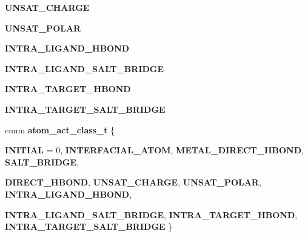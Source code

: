 \begin{CompactItemize}
\item 
\textbf{UNSAT\_\-CHARGE}\label{classASCbase_1_1ProtLigScore_38da0bbb70c6f5a88b37e99939fa72113a2e21f3f5eb470e89630ace57fca557}

\item 
\textbf{UNSAT\_\-POLAR}\label{classASCbase_1_1ProtLigScore_38da0bbb70c6f5a88b37e99939fa721193ca1d17e498b2126dd19ebeb0f93abf}

\item 
\textbf{INTRA\_\-LIGAND\_\-HBOND}\label{classASCbase_1_1ProtLigScore_38da0bbb70c6f5a88b37e99939fa721131df05afc5bf7240b89d5a0b09b0404b}

\item 
\textbf{INTRA\_\-LIGAND\_\-SALT\_\-BRIDGE}\label{classASCbase_1_1ProtLigScore_38da0bbb70c6f5a88b37e99939fa72119f36f771a2f0c2060396f693a09097aa}

\item 
\textbf{INTRA\_\-TARGET\_\-HBOND}\label{classASCbase_1_1ProtLigScore_38da0bbb70c6f5a88b37e99939fa7211465a604ea7061692e2e210b6b5d50a72}

\item 
\textbf{INTRA\_\-TARGET\_\-SALT\_\-BRIDGE}\label{classASCbase_1_1ProtLigScore_38da0bbb70c6f5a88b37e99939fa7211a154b072dd519a883d0b7b9b5c3b1055}

\item 
enum \textbf{atom\_\-act\_\-class\_\-t} \{ \par
\textbf{INITIAL} =  0, 
\textbf{INTERFACIAL\_\-ATOM}, 
\textbf{METAL\_\-DIRECT\_\-HBOND}, 
\textbf{SALT\_\-BRIDGE}, 
\par
\textbf{DIRECT\_\-HBOND}, 
\textbf{UNSAT\_\-CHARGE}, 
\textbf{UNSAT\_\-POLAR}, 
\textbf{INTRA\_\-LIGAND\_\-HBOND}, 
\par
\textbf{INTRA\_\-LIGAND\_\-SALT\_\-BRIDGE}, 
\textbf{INTRA\_\-TARGET\_\-HBOND}, 
\textbf{INTRA\_\-TARGET\_\-SALT\_\-BRIDGE}
 \}
\end{CompactItemize}
